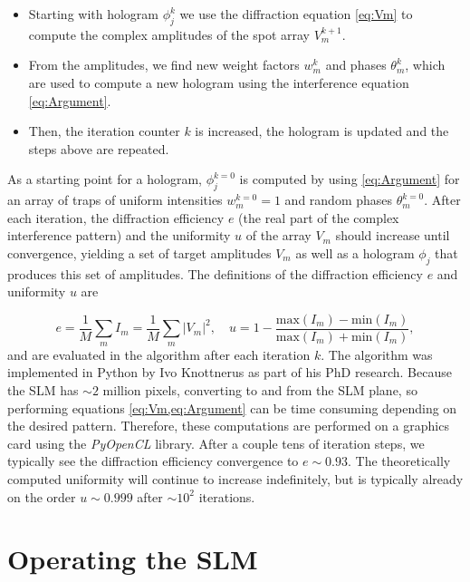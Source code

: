 \begin{itemize}
    \item Starting with hologram $\phi_j^k$ we use the diffraction equation \cref{eq:Vm} to compute the complex amplitudes of the spot array $V_m^{k+1}$. 
    
    \item From the amplitudes, we find new weight factors $w_m^k$ and phases $\theta_m^k$, which are used to compute a new hologram using the interference equation \cref{eq:Argument}.
    
    \item Then, the iteration counter $k$ is increased, the hologram is updated and the steps above are repeated. 
\end{itemize}
As a starting point for a hologram, $\phi_j^{k=0}$ is computed by using \cref{eq:Argument} for an array of traps of uniform intensities $w_m^{k=0} = 1$ and random phases $\theta_m^{k=0}$.
After each iteration, the diffraction efficiency $e$ (the real part of the complex interference pattern) and the uniformity $u$ of the array $V_m$ should increase until convergence, yielding a set of target amplitudes $V_m$ as well as a hologram $\phi_j$ that produces this set of amplitudes.
The definitions of the diffraction efficiency $e$ and uniformity $u$ are 

\begin{equation}\label{eq:EfficiencyUniformity}
    e = \frac{1}{M}\sum_m I_m = \frac{1}{M}\sum_m |V_m|^2, 
    \quad 
    u = 1-\frac{\text{max}(I_m)-\text{min}(I_m)}{\text{max}(I_m)+\text{min}(I_m)},
\end{equation}
and are evaluated in the algorithm after each iteration $k$. 
The algorithm was implemented in Python by Ivo Knottnerus as part of his PhD research.
Because the SLM has $\sim 2$ million pixels, converting to and from the SLM plane, so performing equations \cref{eq:Vm,eq:Argument} can be time consuming depending on the desired pattern.
Therefore, these computations are performed on a graphics card using the \textit{PyOpenCL} library. 
After a couple tens of iteration steps, we typically see the diffraction efficiency convergence to $e \sim 0.93$.
The theoretically computed uniformity will continue to increase indefinitely, but is typically already on the order $u \sim 0.999$ after $\sim 10^2$ iterations.


\section{Operating the SLM}\label{sec:SLMoperatoin}

